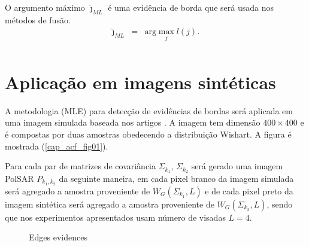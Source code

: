 \documentclass[conference]{IEEEtran}
\begin{document}
O argumento máximo  $\widehat{\jmath}_{ML}$ é uma evidência de borda que será usada nos métodos de fusão.
\begin{equation*}
\begin{array}{rcl}
	\widehat{\jmath}_{ML}&=&\text{arg}\max\limits_{j}l(j).  \\
\end{array}
\end{equation*}

\section{Aplicação em imagens sintéticas}\label{cap_acf_sec4}

A metodologia (MLE) para detecção de evidências de bordas será aplicada em uma imagem simulada baseada nos artigos \cite{nhfc,gamf}. A imagem tem dimensão $400\times400$  e é compostas por duas amostras obedecendo a distribuição Wishart. A figura é mostrada  (\ref{cap_acf_fig01}).

Para cada par de matrizes de covariância $\Sigma_{k_1}$, $\Sigma_{k_2}$ será gerado uma imagem PolSAR $P_{k_1,k_2}$ da seguinte maneira, em cada pixel branco da imagem simulada será agregado a amostra proveniente de $W_G(\Sigma_{k_1}, L)$ e de cada pixel preto da imagem sintética será agregado a amostra proveniente de $W_G(\Sigma_{k_2},L)$, sendo que nos experimentos apresentados usam número de visadas $L=4$.

\begin{figure}[hbt]
    \caption{Edges evidences}
     \label{fig_Edges-Evidence}
\end{figure}   
   
\end{document}
